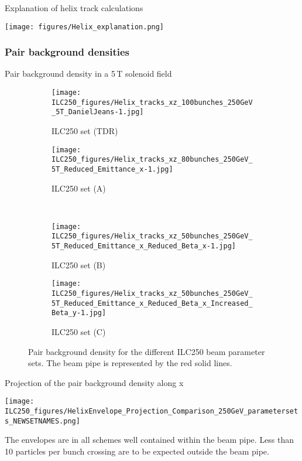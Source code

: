 \documentclass[xcolor={dvipsnames}]{beamer}
\begin{document}
\begin{frame}{Explanation of helix track calculations}
 \begin{center}
  \texttt{[image: figures/Helix\_explanation.png]}
\end{center}
\end{frame}

\subsubsection{Pair background densities}
\begin{frame}{Pair background density in a 5\,T solenoid field}
 \begin{figure}
\centering
\begin{subfigure}[t]{0.35\textwidth}
\centering
\texttt{[image: ILC250\_figures/Helix\_tracks\_xz\_100bunches\_250GeV\_5T\_DanielJeans-1.jpg]}
\caption{ILC250 set (TDR)}
\end{subfigure}
\hspace*{0.1cm}
\begin{subfigure}[t]{0.35\textwidth}
\centering
\texttt{[image: ILC250\_figures/Helix\_tracks\_xz\_80bunches\_250GeV\_5T\_Reduced\_Emittance\_x-1.jpg]}
\caption{ILC250 set (A)}
\end{subfigure}
\\
\begin{subfigure}[t]{0.35\textwidth}
\centering
\texttt{[image: ILC250\_figures/Helix\_tracks\_xz\_50bunches\_250GeV\_5T\_Reduced\_Emittance\_x\_Reduced\_Beta\_x-1.jpg]}
\caption{ILC250 set (B)}
\end{subfigure}
\hspace*{0.1cm}
\begin{subfigure}[t]{0.35\textwidth}
\centering
\texttt{[image: ILC250\_figures/Helix\_tracks\_xz\_50bunches\_250GeV\_5T\_Reduced\_Emittance\_x\_Reduced\_Beta\_x\_Increased\_Beta\_y-1.jpg]}
\caption{ILC250 set (C)}
\end{subfigure}
\caption{Pair background density for the different ILC250 beam parameter sets.
The beam pipe is represented by the red solid lines.}
\label{fig:Envelopes}
\end{figure}

\end{frame}

\begin{frame}{Projection of the pair background density along x}
\begin{center}
 \texttt{[image: ILC250\_figures/HelixEnvelope\_Projection\_Comparison\_250GeV\_parametersets\_NEWSETNAMES.png]}
\end{center}
The envelopes are in all schemes well contained within the beam pipe. Less than 10 particles per bunch crossing are to be expected outside the beam pipe.
\end{frame}
\end{document}
